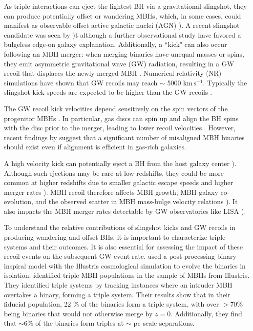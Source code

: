 \documentclass{book}
\newcommand{\kms}{\ensuremath{\mathrm{km\,s^{-1}}}}
\begin{document}
As triple interactions can eject the lightest BH via a gravitational slingshot, they can produce potentially offset or wandering MBHs, which, in some cases, could manifest as observable offset active galactic nuclei (AGN) \citep{barrows_spatially_2016}). A recent slingshot candidate was seen by \citep{vanDokkum2023})t although a further observational study \citep{Montes2024} have favored a bulgeless edge-on  galaxy explanation. Additionally, a ``kick" can also occur following an MBH merger: when merging binaries have unequal masses or spins, they emit asymmetric gravitational wave (GW) radiation, resulting in a GW recoil that displaces the newly merged MBH \citep{bekenstein_gravitational-radiation_1973,Campanelli_2007}. Numerical relativity (NR) simulations have shown that GW recoils may reach $\sim$ 5000 \kms \citep{Campanelli_2007,lousto_orbital_2011}. Typically the slingshot kick speeds are expected to be higher than the GW recoils \citep{hoffman_dynamics_2007,Kesden2010}. 

The GW recoil kick velocities depend sensitively on the spin vectors of the progenitor MBHs \citep{Gonz_lez_2007,Campanelli_2007,Brugmann_2008,Kesden2010,Lousto_2012,Berti_2012,Gerosa_2018}. In particular, gas discs can spin up and align the BH spins with the disc prior to the merger, leading to lower recoil velocities \citep{Scheuer1996,Martin_2007,Bogdanovi__2007,Martin2009,Tremaine2014}. However, recent findings by \citet{sayeb_massive_2021} suggest that a significant number of misaligned MBH binaries should exist even if alignment is efficient in gas-rich galaxies.

A high velocity kick can potentially eject a BH from the host galaxy center \citep{Lousto_2012,Gerosa_2014,Schnittman_2007,Ricarte2021}). Although such ejections may be rare at low redshifts, they could be more common at higher redshifts due to smaller galactic escape speeds and higher merger rates \citep{volonteri_assembly_2003,Blecha2016}). MBH recoil therefore affects MBH growth, MBH-galaxy co-evolution, and the observed scatter in MBH mass-bulge velocity relations \citep{Volonteri_2007,gualandris_ejection_2008,blecha_recoiling_2011}). It also impacts the MBH merger rates detectable by GW observatories like LISA \citep{Sesana_2009}).

To understand the relative contributions of slingshot kicks and GW recoils in producing wandering and offset BHs, it is important to characterize triple systems and their outcomes.  It is also essential for assessing the impact of these recoil events on the subsequent GW event rate. \citet{Kelley_2017a} used a post-processing binary inspiral model with the Illustris cosmological simulation to evolve the binaries in isolation. \citet{sayeb_mbh_2023} identified triple MBH populations in the sample of MBHs from Illustris. They identified triple systems by tracking instances where an intruder MBH overtakes a binary, forming a triple system. Their results show that in their fiducial population, 22 \% of the binaries form a triple system, with over $> 70 \%$ being binaries that would not otherwise merge by $z=0$. Additionally, they find that $\sim 6 \%$ of the binaries form triples at $\sim$ pc scale separations. 
\end{document}
